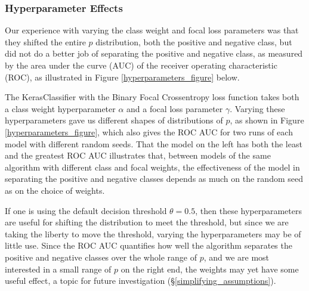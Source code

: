 \FloatBarrier

\subsubsection{Hyperparameter Effects}
\label{hyperparameters}

Our experience with varying the class weight and focal loss parameters was that they shifted the entire $p$ distribution, both the positive and negative class, but did not do a better job of separating the positive and negative class, as measured by the area under the curve (AUC) of the receiver operating characteristic (ROC), as illustrated in Figure \ref{hyperparameters_figure} below.  

The KerasClassifier with the Binary Focal Crossentropy loss function takes both a class weight hyperparameter $\alpha$ and a focal loss parameter $\gamma$.  Varying these hyperparameters gave us different shapes of distributions of $p$, as shown in Figure \ref{hyperparameters_figure}, which also gives the ROC AUC for two runs of each model with different random seeds.  That the model on the left has both the least and the greatest ROC AUC illustrates that, between models of the same algorithm with different class and focal weights, the effectiveness of the model in separating the positive and negative classes depends as much on the random seed as on the choice of weights.  

If one is using the default decision threshold $\theta = 0.5$, then these hyperparameters are useful for shifting the distribution to meet the threshold, but since we are taking the liberty to move the threshold, varying the hyperparameters may be of little use.  Since the ROC AUC quantifies how well the algorithm separates the positive and negative classes over the whole range of $p$, and we are most interested in a small range of $p$ on the right end, the weights may yet have some useful effect, a topic for future investigation (\S\ref{simplifying_assumptions}).

